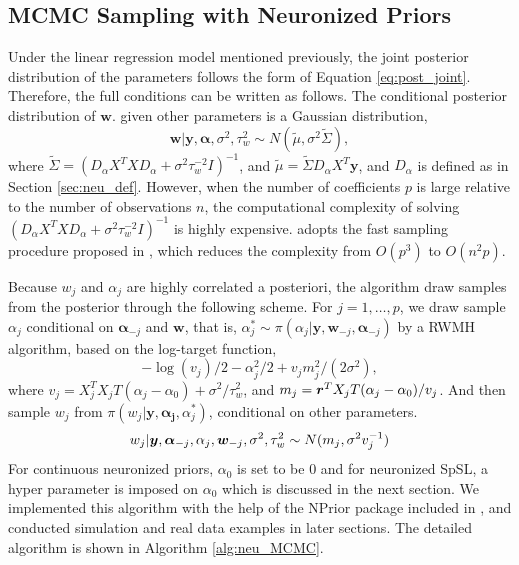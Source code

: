 \subsection{MCMC Sampling with Neuronized Priors}

Under the linear regression model mentioned previously, the joint posterior distribution of the parameters follows the form of Equation \eqref{eq:post_joint}. Therefore, the full conditions can be written as follows. The conditional posterior distribution of $\bm{w}$. given other parameters is a Gaussian distribution,
\begin{equation} \label{eq:w_condi}
    \bm{w} | \bm{y}, \bm{\alpha}, \sigma^2, \tau_w^2 \sim N(\tilde{\mu}, \sigma^2 \tilde{\Sigma}),
\end{equation}
where $\tilde{\Sigma} = (D_\alpha X^T X D_\alpha + \sigma^2 \tau_w^{-2} I)^{-1}$, and $\tilde{\mu} = \tilde{\Sigma} D_\alpha X^T \bm{y}$, and $D_\alpha$ is defined as in Section \ref{sec:neu_def}. However, when the number of coefficients $p$ is large relative to the number of observations $n$, the computational complexity of solving $(D_\alpha X^T X D_\alpha + \sigma^2 \tau_w^{-2} I)^{-1}$ is highly expensive. \citet{shin2021neuronized} adopts the fast sampling procedure proposed in \citet{bhattacharya2016fast}, which reduces the complexity from $O(p^3)$ to $O(n^2p)$.

Because $w_j$ and $\alpha_j$ are highly correlated a posteriori, the algorithm draw samples from the posterior through the following scheme. For $j=1,\dots, p$, we draw sample $\alpha_j$ conditional on $\bm{\alpha}_{-j}$ and $\bm{w}$, that is, $\alpha_j^* \sim \pi(\alpha_j| \bm{y}, \bm{w}_{-j}, \bm{\alpha}_{-j})$ by a RWMH algorithm, based on the log-target function,
\begin{equation} \label{eq:log-target}
    - \log (v_j) / 2 - \alpha_j^2 /2 + v_j m_j^2 / (2\sigma^2),
\end{equation}
where $v_j = X^T_j X_j T(\alpha_j - \alpha_0) + \sigma^2 / \tau_w^2$, and $m_j = \bm{r}^T X_j T(\alpha_j - \alpha_0)/v_j$. And then sample $w_j$ from $\pi(w_j| \bm{y}, \bm{\alpha_j}, \alpha_j^*)$, conditional on other parameters. 
\begin{equation} \label{eq:w_j_sample}
    w_j | \bm{y}, \bm{\alpha}_{-j},\alpha_j, \bm{w}_{-j}, \sigma^2, \tau_w^2 \sim N(m_j, \sigma^2 v_j^{-1})
\end{equation} 
For continuous neuronized priors, $\alpha_0$ is set to be 0 and for neuronized SpSL, a hyper parameter is imposed on $\alpha_0$ which is discussed in the next section. We implemented this algorithm with the help of the NPrior package included in \citet{shin2021neuronized}, and conducted simulation and real data examples in later sections. The detailed algorithm is shown in Algorithm \ref{alg:neu_MCMC}.

